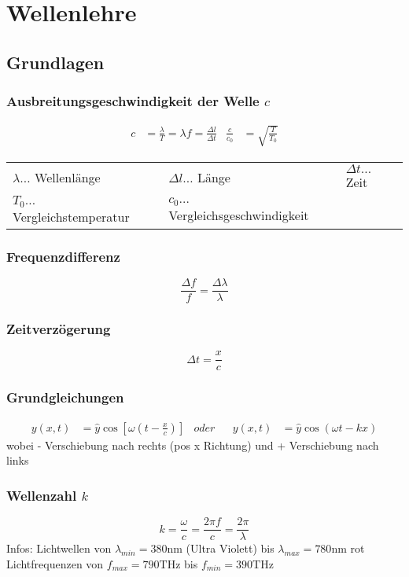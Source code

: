 \chapter{Wellenlehre}
	\section{Grundlagen}
		\subsection{Ausbreitungsgeschwindigkeit der Welle $c$}
			\begin{align*}
			c &= \frac{\lambda}{T} = \lambda f = \frac{\Delta l}{\Delta t} 
			& \frac{c}{c_0}&=\sqrt{\frac{T}{T_0}}
			\end{align*}

			\begin{table}[h]
			\begin{tabular}{lll}
			$\lambda\dots$ Wellenlänge & $\Delta l\dots$ Länge & $\Delta t\dots$ Zeit\\
			$T_0\dots$ Vergleichstemperatur & $c_0\dots$ Vergleichsgeschwindigkeit &\\
			\end{tabular}
			\end{table}
		
		\subsection{Frequenzdifferenz}
			\[\frac{\Delta f}{f}=\frac{\Delta \lambda}{\lambda}\]
        
		\subsection{Zeitverzögerung}
			\[ \Delta t = \frac{x}{c} \]
			
		\subsection{Grundgleichungen}
			\begin{align*}
				y(x,t) & = \hat{y} \cos [\omega(t-\frac{x}{c})] &oder& & y(x,t) &= \hat{y} \cos(\omega t-kx) 
			\end{align*}
			wobei - Verschiebung nach rechts (pos x Richtung) \newline
			und + Verschiebung nach links
        
		\subsection{Wellenzahl $k$}
			\[ k  = \frac{\omega}{c} = \frac{2\pi f}{c} = \frac{2\pi}{\lambda} \]
			Infos: \newline
			Lichtwellen von $\lambda_{min} = 380 \mathrm{nm}$ (Ultra Violett) bis $\lambda_{max} = 780\mathrm{nm}$ rot \newline
			Lichtfrequenzen von $f_{max} = 790\mathrm{THz}$ bis $f_{min} = 390 \mathrm{THz}$
        
